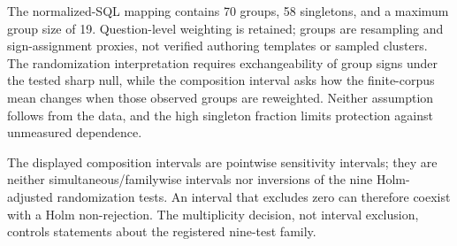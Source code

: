 \documentclass[applsci,article,submit,moreauthors]{Definitions/mdpi}
\begin{document}
\begin{table}[htbp]
\caption{Complete primary factorial family for strict execution equality. Estimates are question-weighted finite-set differences; intervals are 95\% normalized-SQL-group composition-sensitivity intervals. Each sign-randomization used 70 groups, 100,000 draws, and the displayed raw values were Holm-adjusted jointly over all nine rows.}
\label{tab:factorial-nine}\centering\scriptsize
{}
\end{table}

The normalized-SQL mapping contains 70 groups, 58 singletons, and a maximum group size of 19. Question-level weighting is retained; groups are resampling and sign-assignment proxies, not verified authoring templates or sampled clusters. The randomization interpretation requires exchangeability of group signs under the tested sharp null, while the composition interval asks how the finite-corpus mean changes when those observed groups are reweighted. Neither assumption follows from the data, and the high singleton fraction limits protection against unmeasured dependence.

The displayed composition intervals are pointwise sensitivity intervals; they are neither simultaneous/familywise intervals nor inversions of the nine Holm-adjusted randomization tests. An interval that excludes zero can therefore coexist with a Holm non-rejection. The multiplicity decision, not interval exclusion, controls statements about the registered nine-test family.
\end{document}

